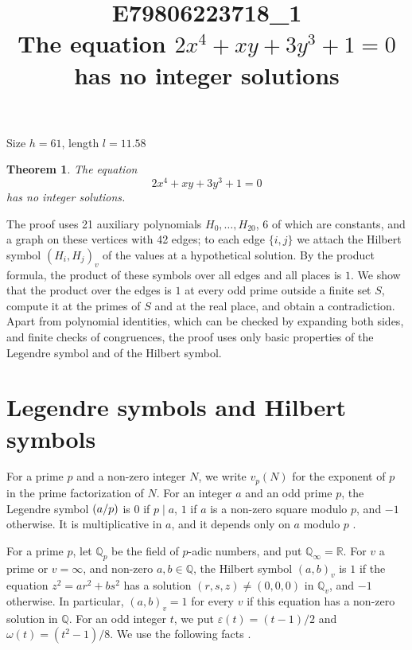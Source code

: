 \documentclass[11pt]{article}
\title{\textbf{E79806223718\_1}\\[4pt] {\Large The equation $2x^{4}+xy+3y^{3}+1=0$ has no integer solutions}}
\author{}
\date{}
\newtheorem{theorem}{Theorem}
\newcommand{\Q}{\mathbb{Q}}
\newcommand{\leg}[2]{\mathchoice{\biggl(\dfrac{#1}{#2}\biggr)}{(#1/#2)}{(#1/#2)}{(#1/#2)}}
\begin{document}
\maketitle
\vspace{-8ex}
\begin{center}
Size $h=61$, length $l=11.58$
\end{center}

\begin{theorem}\label{thm:main}
The equation
\begin{equation}\label{eq:main}
2x^{4}+xy+3y^{3}+1=0
\end{equation}
has no integer solutions.
\end{theorem}

The proof uses 21 auxiliary polynomials $H_0,\dots,H_{20}$, 6 of which are constants, and a graph on these vertices with 42 edges; to each edge $\{i,j\}$ we attach the Hilbert symbol $(H_i,H_j)_v$ of the values at a hypothetical solution. By the product formula, the product of these symbols over all edges and all places is $1$. We show that the product over the edges is $1$ at every odd prime outside a finite set $S$, compute it at the primes of $S$ and at the real place, and obtain a contradiction. Apart from polynomial identities, which can be checked by expanding both sides, and finite checks of congruences, the proof uses only basic properties of the Legendre symbol and of the Hilbert symbol.

\section{Legendre symbols and Hilbert symbols}

For a prime $p$ and a non-zero integer $N$, we write $v_p(N)$ for the exponent of $p$ in the prime factorization of $N$. For an integer $a$ and an odd prime $p$, the Legendre symbol $\leg{a}{p}$ is $0$ if $p\mid a$, $1$ if $a$ is a non-zero square modulo $p$, and $-1$ otherwise. It is multiplicative in $a$, and it depends only on $a$ modulo $p$ \cite[Chapter~5]{IR}.

For a prime $p$, let $\Q_p$ be the field of $p$-adic numbers, and put $\Q_\infty=\mathbb R$. For $v$ a prime or $v=\infty$, and non-zero $a,b\in\Q$, the Hilbert symbol $(a,b)_v$ is $1$ if the equation $z^2=ar^2+bs^2$ has a solution $(r,s,z)\neq(0,0,0)$ in $\Q_v$, and $-1$ otherwise. In particular, $(a,b)_v=1$ for every $v$ if this equation has a non-zero solution in $\Q$. For an odd integer $t$, we put $\varepsilon(t)=(t-1)/2$ and $\omega(t)=(t^2-1)/8$. We use the following facts \cite[Chapter~III, Proposition~2 and Theorems~1 and~3]{Se}.
\end{document}
